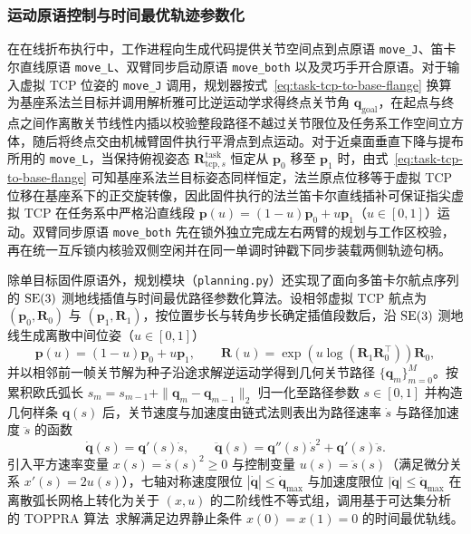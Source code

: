 \subsubsection{运动原语控制与时间最优轨迹参数化}

在在线折布执行中，工作进程向生成代码提供关节空间点到点原语 \texttt{move\_J}、笛卡尔直线原语 \texttt{move\_L}、双臂同步启动原语 \texttt{move\_both} 以及灵巧手开合原语。对于输入虚拟 TCP 位姿的 \texttt{move\_J} 调用，规划器按式~\eqref{eq:task-tcp-to-base-flange} 换算为基座系法兰目标并调用解析雅可比逆运动学求得终点关节角 $\bm{q}_{\text{goal}}$，在起点与终点之间作离散关节线性内插以校验整段路径不越过关节限位及任务系工作空间立方体，随后将终点交由机械臂固件执行平滑点到点运动。对于近桌面垂直下降与提布所用的 \texttt{move\_L}，当保持俯视姿态 $\bm{R}_{\text{tcp},s}^{\text{task}}$ 恒定从 $\bm{p}_0$ 移至 $\bm{p}_1$ 时，由式~\eqref{eq:task-tcp-to-base-flange} 可知基座系法兰目标姿态同样恒定，法兰原点位移等于虚拟 TCP 位移在基座系下的正交旋转像，因此固件执行的法兰笛卡尔直线插补可保证指尖虚拟 TCP 在任务系中严格沿直线段 $\bm{p}(u) = (1-u)\bm{p}_0 + u\bm{p}_1$（$u \in [0, 1]$）运动。双臂同步原语 \texttt{move\_both} 先在锁外独立完成左右两臂的规划与工作区校验，再在统一互斥锁内核验双侧空闲并在同一单调时钟戳下同步装载两侧轨迹句柄。

除单目标固件原语外，规划模块（\texttt{planning.py}）还实现了面向多笛卡尔航点序列的 $\mathrm{SE}(3)$ 测地线插值与时间最优路径参数化算法。设相邻虚拟 TCP 航点为 $(\bm{p}_0, \bm{R}_0)$ 与 $(\bm{p}_1, \bm{R}_1)$，按位置步长与转角步长确定插值段数后，沿 $\mathrm{SE}(3)$ 测地线生成离散中间位姿（$u \in [0, 1]$）
\begin{equation}
  \bm{p}(u) = (1 - u)\bm{p}_0 + u\bm{p}_1, \qquad
  \bm{R}(u) = \exp\!\left(u\log\!\left(\bm{R}_1\bm{R}_0^{\top}\right)\right)\bm{R}_0,
  \label{eq:se3-geodesic}
\end{equation}
并以相邻前一帧关节解为种子沿途求解逆运动学得到几何关节路径 $\{\bm{q}_m\}_{m=0}^M$。按累积欧氏弧长 $s_m = s_{m-1} + \|\bm{q}_m - \bm{q}_{m-1}\|_2$ 归一化至路径参数 $s \in [0, 1]$ 并构造几何样条 $\bm{q}(s)$ 后，关节速度与加速度由链式法则表出为路径速率 $\dot{s}$ 与路径加速度 $\ddot{s}$ 的函数
\begin{equation}
  \dot{\bm{q}}(s) = \bm{q}'(s)\dot{s}, \qquad
  \ddot{\bm{q}}(s) = \bm{q}''(s)\dot{s}^2 + \bm{q}'(s)\ddot{s}.
  \label{eq:toppra-chain}
\end{equation}
引入平方速率变量 $x(s) = \dot{s}(s)^2 \ge 0$ 与控制变量 $u(s) = \ddot{s}(s)$（满足微分关系 $x'(s) = 2u(s)$），七轴对称速度限位 $|\dot{\bm{q}}| \le \dot{\bm{q}}_{\max}$ 与加速度限位 $|\ddot{\bm{q}}| \le \ddot{\bm{q}}_{\max}$ 在离散弧长网格上转化为关于 $(x, u)$ 的二阶线性不等式组，调用基于可达集分析的 TOPPRA 算法~\cite{pham2018toppra}求解满足边界静止条件 $x(0) = x(1) = 0$ 的时间最优轨线。

